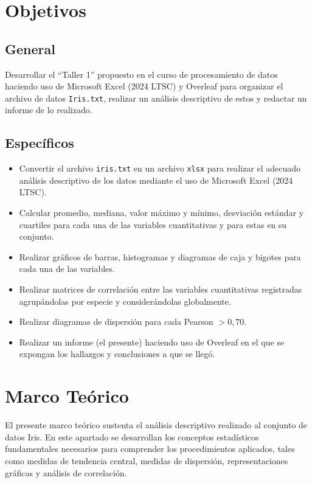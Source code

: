 \documentclass[12pt,a4paper]{article}
\begin{document}
\section{Objetivos}

\subsection*{General}

Desarrollar el ``Taller 1'' propuesto en el curso de procesamiento de datos haciendo uso de Microsoft Excel (2024 LTSC) y Overleaf para organizar el archivo de datos \texttt{Iris.txt}, realizar un análisis descriptivo de estos y redactar un informe de lo realizado.

\subsection*{Específicos}

\begin{itemize}
    \item Convertir el archivo \texttt{iris.txt} en un archivo \texttt{xlsx} para realizar el adecuado análisis descriptivo de los datos mediante el uso de Microsoft Excel (2024 LTSC).
    \item Calcular promedio, mediana, valor máximo y mínimo, desviación estándar y cuartiles para cada una de las variables cuantitativas y para estas en su conjunto.
    \item Realizar gráficos de barras, histogramas y diagramas de caja y bigotes para cada una de las variables.
    \item Realizar matrices de correlación entre las variables cuantitativas registradas agrupándolas por especie y considerándolas globalmente.
    \item Realizar diagramas de dispersión para cada Pearson $> 0{,}70$.
    \item Realizar un informe (el presente) haciendo uso de Overleaf en el que se expongan los hallazgos y conclusiones a que se llegó.
\end{itemize}

\section{Marco Teórico}

El presente marco teórico sustenta el análisis descriptivo realizado al conjunto de datos Iris. En este apartado se desarrollan los conceptos estadísticos fundamentales necesarios para comprender los procedimientos aplicados, tales como medidas de tendencia central, medidas de dispersión, representaciones gráficas y análisis de correlación.
\end{document}
